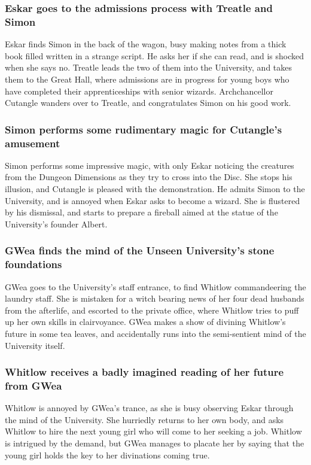 \subsubsection{\Gls{Eskar} goes to the admissions process with \Gls{Treatle} and \Gls{Simon}}
\Gls{Eskar} finds \Gls{Simon} in the back of the wagon, busy making notes from a thick book filled
written in a strange script. He asks her if she can read, and is shocked when she says no.
\Gls{Treatle} leads the two of them into the University, and takes them to the Great Hall, where
admissions are in progress for young boys who have completed their apprenticeships with senior
wizards. Archchancellor \Gls{Cutangle} wanders over to \Gls{Treatle}, and congratulates \Gls{Simon}
on his good work.

\subsubsection{\Gls{Simon} performs some rudimentary magic for \Gls{Cutangle}'s amusement}
\Gls{Simon} performs some impressive magic, with only \Gls{Eskar} noticing the creatures from the
Dungeon Dimensions as they try to cross into the Disc. She stops his illusion, and \Gls{Cutangle} is
pleased with the demonstration. He admits \Gls{Simon} to the University, and is annoyed when
\Gls{Eskar} asks to become a wizard. She is flustered by his dismissal, and starts to prepare a
fireball aimed at the statue of the University's founder \Gls{Albert}.

\subsubsection{\Gls{GWea} finds the mind of the Unseen University's stone foundations}
\Gls{GWea} goes to the University's staff entrance, to find \Gls{Whitlow} commandeering the laundry
staff. She is mistaken for a witch bearing news of her four dead husbands from the afterlife, and
escorted to the private office, where \Gls{Whitlow} tries to puff up her own skills in clairvoyance.
\Gls{GWea} makes a show of divining \Gls{Whitlow}'s future in some tea leaves, and accidentally runs
into the semi-sentient mind of the University itself.

\subsubsection{\Gls{Whitlow} receives a badly imagined reading of her future from \Gls{GWea}}
\Gls{Whitlow} is annoyed by \Gls{GWea}'s trance, as she is busy observing \Gls{Eskar} through the
mind of the University. She hurriedly returns to her own body, and asks \Gls{Whitlow} to hire the
next young girl who will come to her seeking a job. \Gls{Whitlow} is intrigued by the demand, but
\Gls{GWea} manages to placate her by saying that the young girl holds the key to her divinations
coming true.

